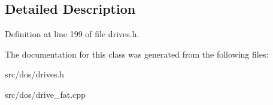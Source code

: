 \subsection{Detailed Description}


Definition at line 199 of file drives.\-h.



The documentation for this class was generated from the following files\-:\begin{DoxyCompactItemize}
\item 
src/dos/drives.\-h\item 
src/dos/drive\-\_\-fat.\-cpp\end{DoxyCompactItemize}
